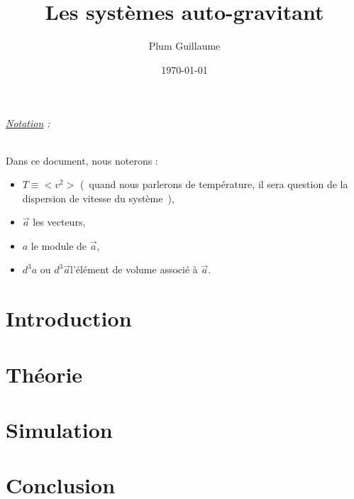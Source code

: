 \documentclass[a4paper,11pt,twoside,openright]{report}
\title{Les systèmes auto-gravitant}
\author{Plum Guillaume}
\date{\today}
\renewcommand{\(}{\ensuremath{\left(}}
\renewcommand{\)}{\ensuremath{\right)}}
\begin{document}
	\dominitoc
	

	\cleardoublepage

	\small \tableofcontents
	\listoffigures
	\listoftables
	\normalsize

	\paragraph*{\underline{Notation} :}
	Dans ce document, nous noterons :
	\begin{itemize}
		\item $T \equiv <v^2>$ (~quand nous parlerons de température, il sera question de la dispersion de vitesse du système~),
		\item $\vec{a}$ les vecteurs,
		\item $a$ le module de $\vec{a}$,
		\item $d^3 a$ ou $d^3 \vec{a}$l'élément de volume associé à $\vec{a}$.
	\end{itemize}


	\pagestyle{fancy}
	\renewcommand{\chaptermark}[1]{\markboth{\MakeUppercase{\chaptername}\ \thechapter.\ #1}{}}


	\part{Introduction}
		

	\part{Théorie}
		


	\part{Simulation}
		

	\part*{Conclusion}
\end{document}
